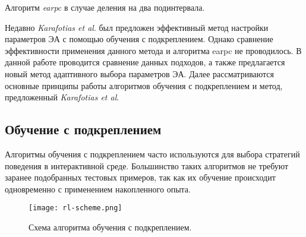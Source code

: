 \begin{algorithm}[h!]
    \caption{Алгоритм \textit{earpc} в случае деления на два подинтервала.}
    \label{earpc_scheme}
    \begin{algorithmic}[1]
	      \ENDIF
	    \ENDFOR
	\ENDFOR
    \end{algorithmic}
\end{algorithm}

Недавно \textit{Karafotias et al}. был предложен эффективный метод настройки параметров ЭА с помощью обучения с подкреплением. Однако сравнение эффективности применения данного метода и алгоритма earpc не проводилось. В данной работе проводится сравнение данных подходов, а также предлагается новый метод адаптивного выбора параметров ЭА. Далее рассматриваются  основные принципы работы алгоритмов обучения с подкреплением и метод, предложенный \textit{Karafotias et al}.

\subsection{Обучение с подкреплением}
\label{rl}
Алгоритмы обучения с подкреплением часто используются для выбора стратегий поведения в интерактивной среде. Большинство таких алгоритмов не требуют заранее подобранных тестовых примеров, так как их обучение происходит одновременно с применением накопленного опыта.

\begin{figure}
    \centering
    \texttt{[image: rl-scheme.png]}
    \caption{Схема алгоритма обучения с подкреплением.}
    \label{rl_scheme}
\end{figure}

